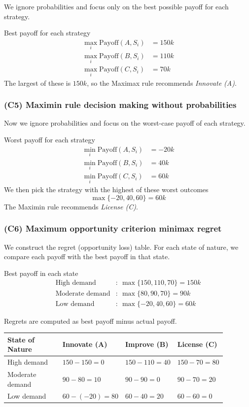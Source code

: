 \documentclass[11pt]{article}
\begin{document}
	We ignore probabilities and focus only on the best possible payoff for each strategy.
	
	Best payoff for each strategy
	\[
	\begin{aligned}
		\max_i \text{Payoff}(A, S_i) &= 150k\\
		\max_i \text{Payoff}(B, S_i) &= 110k\\
		\max_i \text{Payoff}(C, S_i) &= 70k
	\end{aligned}
	\]
	The largest of these is \(150k\), so the Maximax rule recommends \emph{Innovate (A)}.
	
	\subsubsection{(C5) Maximin rule decision making without probabilities}\label{example-1-c5}
	
	Now we ignore probabilities and focus on the worst-case payoff of each strategy.
	
	Worst payoff for each strategy
	\[
	\begin{aligned}
		\min_i \text{Payoff}(A, S_i) &= -20k\\
		\min_i \text{Payoff}(B, S_i) &= 40k\\
		\min_i \text{Payoff}(C, S_i) &= 60k
	\end{aligned}
	\]
	We then pick the strategy with the highest of these worst outcomes
	\[
	\max\{-20, 40, 60\} = 60k
	\]
	The Maximin rule recommends \emph{License (C)}.
	
	\subsubsection{(C6) Maximum opportunity criterion minimax regret}\label{example-1-c6}
	
	We construct the regret (opportunity loss) table. For each state of nature, we compare each payoff
	with the best payoff in that state.
	
	Best payoff in each state
	\[
	\begin{aligned}
		\text{High demand} &:\ \max\{150, 110, 70\} = 150k\\
		\text{Moderate demand} &:\ \max\{80, 90, 70\} = 90k\\
		\text{Low demand} &:\ \max\{-20, 40, 60\} = 60k
	\end{aligned}
	\]
	
	Regrets are computed as best payoff minus actual payoff.
	
	\begin{center}
		\begin{tabular}{@{}p{0.28\linewidth}p{0.20\linewidth}p{0.20\linewidth}p{0.20\linewidth}@{}}
			\toprule
			State of Nature & Innovate (A) & Improve (B) & License (C) \\
			\midrule
			High demand     & \(150-150=0\) & \(150-110=40\) & \(150-70=80\) \\
			Moderate demand & \(90-80=10\)  & \(90-90=0\)    & \(90-70=20\) \\
			Low demand      & \(60-(-20)=80\) & \(60-40=20\) & \(60-60=0\) \\
			\bottomrule
		\end{tabular}
	\end{center}
	
\end{document}
